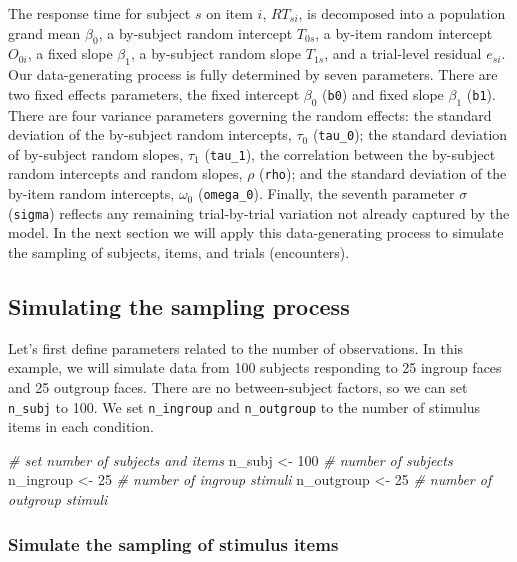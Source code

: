 \documentclass[
  english,
  doc,floatsintext]{apa6}
\newenvironment{Shaded}{\begin{snugshade}}{\end{snugshade}}
\newcommand{\CommentTok}[1]{\textcolor[rgb]{0.56,0.35,0.01}{\textit{#1}}}
\newcommand{\DecValTok}[1]{\textcolor[rgb]{0.00,0.00,0.81}{#1}}
\newcommand{\NormalTok}[1]{#1}
\newcommand{\StringTok}[1]{\textcolor[rgb]{0.31,0.60,0.02}{#1}}
\begin{document}
\noindent The response time for subject \(s\) on item \(i\), \(RT_{si}\), is decomposed into a population grand mean \(\beta_0\), a by-subject random intercept \(T_{0s}\), a by-item random intercept \(O_{0i}\), a fixed slope \(\beta_1\), a by-subject random slope \(T_{1s}\), and a trial-level residual \(e_{si}\). Our data-generating process is fully determined by seven parameters. There are two fixed effects parameters, the fixed intercept \(\beta_0\) (\texttt{b0}) and fixed slope \(\beta_1\) (\texttt{b1}). There are four variance parameters governing the random effects: the standard deviation of the by-subject random intercepts, \(\tau_0\) (\texttt{tau\_0}); the standard deviation of by-subject random slopes, \(\tau_1\) (\texttt{tau\_1}), the correlation between the by-subject random intercepts and random slopes, \(\rho\) (\texttt{rho}); and the standard deviation of the by-item random intercepts, \(\omega_0\) (\texttt{omega\_0}). Finally, the seventh parameter \(\sigma\) (\texttt{sigma}) reflects any remaining trial-by-trial variation not already captured by the model. In the next section we will apply this data-generating process to simulate the sampling of subjects, items, and trials (encounters).

\hypertarget{simulating-the-sampling-process}{%
\subsection{Simulating the sampling process}\label{simulating-the-sampling-process}}

Let's first define parameters related to the number of observations. In this example, we will simulate data from 100 subjects responding to 25 ingroup faces and 25 outgroup faces. There are no between-subject factors, so we can set \texttt{n\_subj} to 100. We set \texttt{n\_ingroup} and \texttt{n\_outgroup} to the number of stimulus items in each condition.

\begin{Shaded}
\begin{Highlighting}[]
\CommentTok{# set number of subjects and items}
\NormalTok{n_subj     <-}\StringTok{ }\DecValTok{100} \CommentTok{# number of subjects}
\NormalTok{n_ingroup  <-}\StringTok{  }\DecValTok{25} \CommentTok{# number of ingroup stimuli}
\NormalTok{n_outgroup <-}\StringTok{  }\DecValTok{25} \CommentTok{# number of outgroup stimuli}
\end{Highlighting}
\end{Shaded}

\hypertarget{simulate-the-sampling-of-stimulus-items}{%
\subsubsection{Simulate the sampling of stimulus items}\label{simulate-the-sampling-of-stimulus-items}}
\end{document}
